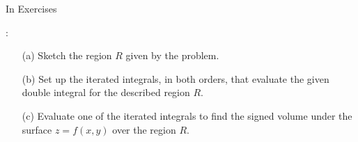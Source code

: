 {\noindent In Exercises}
{: 
\begin{enumerate}
\item [(a)] Sketch the region $R$ given by the problem.
\item	[(b)] Set up the iterated integrals, in both orders, that evaluate the given double integral for the described region $R$. 
\item [(c)] Evaluate one of the iterated integrals to find the signed volume under the surface $z=f(x,y)$ over the region $R$.
\end{enumerate}
}

